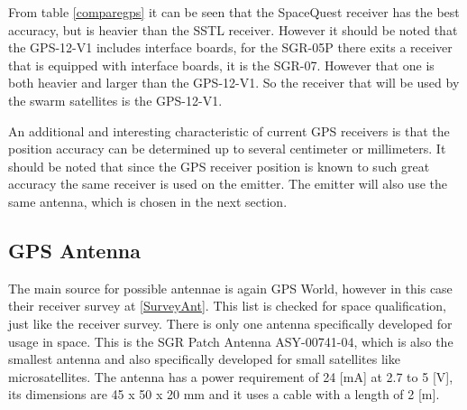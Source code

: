 \documentclass[11pt]{report}
\begin{document}
From table \ref{comparegps} it can be seen that the SpaceQuest receiver has the best accuracy, but is heavier than the \acs{SSTL} receiver. However it should be noted that the GPS-12-V1 includes interface boards, for the SGR-05P there exits a receiver that is equipped with interface boards, it is the SGR-07. However that one is both heavier and larger than the GPS-12-V1. So the receiver that will be used by the swarm satellites is the GPS-12-V1.

An additional and interesting characteristic of current \acs{GPS} receivers is that the position accuracy can be determined up to several centimeter or millimeters. It should be noted that since the \acs{GPS} receiver position is known to such great accuracy the same receiver is used on the emitter. The emitter will also use the same antenna, which is chosen in the next section.

\subsection{GPS Antenna}
The main source for possible antennae is again GPS World, however in this case their receiver survey at \ref{SurveyAnt}. This list is checked for space qualification, just like the receiver survey. There is only one antenna specifically developed for usage in space. This is the SGR Patch Antenna ASY-00741-04, which is also the smallest antenna and also specifically developed for small satellites like microsatellites.
The antenna has a power requirement of 24 [mA] at 2.7 to 5 [V], its dimensions are 45 x 50 x 20 mm and it uses a cable with a length of 2 [m].
\end{document}

